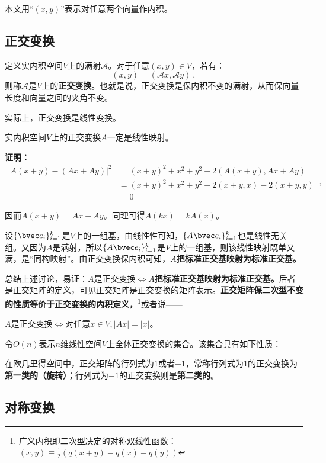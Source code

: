 
本文用“$(x,y)$”表示对任意两个向量作内积。
\subsection{正交变换}
\begin{definition}{}
定义实内积空间$V$上的满射$\mathcal A$。对于任意$(x,y)\in V$，若有：
\begin{equation}
(x,y)=(\mathcal A x,\mathcal A y)~,
\end{equation}
则称$\mathcal A$是$V$上的\textbf{正交变换}。也就是说，正交变换是保内积不变的满射，从而保向量长度和向量之间的夹角不变。
\end{definition}
实际上，正交变换是线性变换。
\begin{theorem}{}
实内积空间$V$上的正交变换$A$一定是线性映射。
\end{theorem}
\textbf{证明：}
\begin{equation}
\begin{aligned}
|A(x+y)-(Ax+Ay)|^2&=(x+y)^2+x^2+y^2-2\left(A(x+y),Ax+Ay\right)\\
&=(x+y)^2+x^2+y^2-2(x+y,x)-2(x+y,y)\\
&=0
\end{aligned}
~,\end{equation}

因而$A(x+y)=Ax+Ay$。同理可得$A(kx)=kA(x)$。

设$\{\bvec e_i\}^k_{i=1}$是$V$上的一组基，由线性性可知，$\{A\bvec e_i\}^k_{i=1}$也是线性无关组。又因为$A$是满射，所以$\{A\bvec e_i\}^k_{i=1}$是$V$上的一组基，则该线性映射既单又满，是“同构映射”。由正交变换保内积可知，$A$\textbf{把标准正交基映射为标准正交基。}

总结上述讨论，易证：$A$是正交变换$\Longleftrightarrow A$\textbf{把标准正交基映射为标准正交基。}后者是正交矩阵的定义，可见正交矩阵是正交变换的矩阵表示。\textbf{正交矩阵保二次型不变的性质等价于正交变换的内积定义，}\footnote{广义内积即二次型决定的对称双线性函数：$(x,y)\equiv \frac{1}{2}(q(x+y)-q(x)-q(y))$}或者说——

$A$是正交变换$\Longleftrightarrow $对任意$x\in V,|Ax|=|x|$。

令$O(n)$表示$n$维线性空间$V$上全体正交变换的集合。该集合具有如下性质：


在欧几里得空间中，正交矩阵的行列式为$1$或者$-1$，常称行列式为$1$的正交变换为\textbf{第一类的（旋转）}；行列式为$-1$的正交变换则是\textbf{第二类的}。
\subsection{对称变换}



